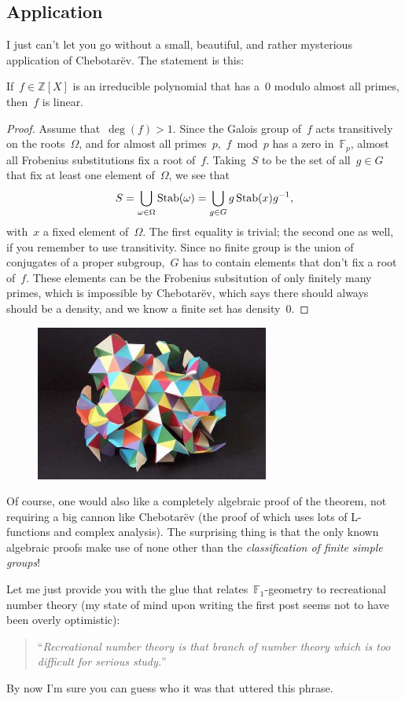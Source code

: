 \subsection{Application}

I just can't let you go without a small, beautiful, and rather mysterious application of Chebotar\"ev. The statement is this:

\begin{corollary}
  If~$f \in \mathbb{Z}[X]$ is an irreducible polynomial that has a~$0$ modulo almost all primes, then~$f$ is linear.

  \begin{proof}
    Assume that~$\deg(f)>1$. Since the Galois group of~$f$ acts transitively on the roots~$\Omega$, and for almost all primes~$p$,~$f\bmod p$ has a zero in~$\mathbb{F}_{p}$, almost all Frobenius substitutions fix a root of~$f$. Taking~$S$ to be the set of all~$g \in G$ that fix at least one element of~$\Omega$, we see that
    \begin{equation}
      S=\bigcup_{\omega \in \Omega} \operatorname{Stab}(\omega)=\bigcup_{g \in G} g \operatorname{Stab}(x) g^{-1}, 
    \end{equation}
    with~$x$ a fixed element of~$\Omega$. The first equality is trivial; the second one as well, if you remember to use transitivity. Since no finite group is the union of conjugates of a proper subgroup,~$G$ has to contain elements that don't fix a root of~$f$. These elements can be the Frobenius subsitution of only finitely many primes, which is impossible by Chebotar\"ev, which says there should always should be a density, and we know a finite set has density~$0$.
  \end{proof}
\end{corollary}

\begin{figure}
  \centering
  \includegraphics[width=.3\textwidth]{chebotarev-density/hyperbolic}
\end{figure}
Of course, one would also like a completely algebraic proof of the theorem, not requiring a big cannon like Chebotar\"ev (the proof of which uses lots of L-functions and complex analysis). The surprising thing is that the only known algebraic proofs make use of none other than the \emph{classification of finite simple groups}!

Let me just provide you with the glue that relates~$\mathbb{F}_{1}$-geometry to recreational number theory (my state of mind upon writing the first post seems not to have been overly optimistic):
\begin{quote}
  ``\textsl{Recreational number theory is that branch of number theory which is too difficult for serious study.}''
\end{quote}
By now I'm sure you can guess who it was that uttered this phrase.
